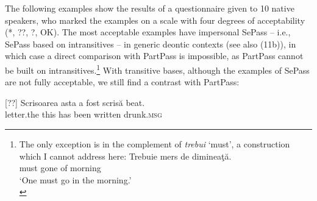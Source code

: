\documentclass[output=paper]{langsci/langscibook}
\begin{document}
The following examples show the results of a questionnaire given to 10 native speakers, who marked the examples on a scale with four degrees of acceptability (*, ??, ?, OK). The most acceptable examples have impersonal SePass – i.e., SePass based on intransitives – in generic deontic contexts (see also (11b)), in which case a direct comparison with PartPass is impossible, as PartPass cannot be built on intransitives.\footnote{The only exception is in the complement of \textit{trebui} ‘must’, a construction which I cannot address here:
\ea \gll  Trebuie mers de dimineaţă.\\
    must     gone  of morning\\
    \glt ‘One must go in the morning.’\\
    \z} With transitive bases, although the examples of SePass are not fully acceptable, we still find a contrast with PartPass:

\settowidth{}
\ea%
    \label{ex:giurgea:41}
    \begin{xlista}
[??]{
    \gll Scrisoarea asta a    fost   scrisă   beat.        \\
         letter.the   this has been written drunk.\textsc{msg}\\}
\end{xlista}
\z


\ea%
    \label{ex:giurgea:42}
    \z
\z
\end{document}
